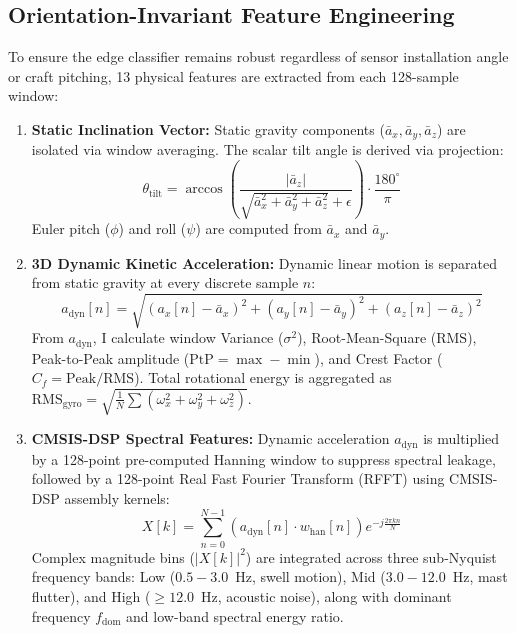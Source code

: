 \documentclass[twocolumn]{article}
\begin{document}
\subsection{Orientation-Invariant Feature Engineering}
To ensure the edge classifier remains robust regardless of sensor installation angle or craft pitching, 13 physical features are extracted from each 128-sample window:
\begin{enumerate}[noitemsep]
    \item \textbf{Static Inclination Vector:} Static gravity components ($\bar{a}_x, \bar{a}_y, \bar{a}_z$) are isolated via window averaging. The scalar tilt angle is derived via projection:
    \begin{equation}
        \theta_{\text{tilt}} = \arccos \left( \frac{|\bar{a}_z|}{\sqrt{\bar{a}_x^2 + \bar{a}_y^2 + \bar{a}_z^2} + \epsilon} \right) \cdot \frac{180^\circ}{\pi}
    \end{equation}
    Euler pitch ($\phi$) and roll ($\psi$) are computed from $\bar{a}_x$ and $\bar{a}_y$.
    \item \textbf{3D Dynamic Kinetic Acceleration:} Dynamic linear motion is separated from static gravity at every discrete sample $n$:
    \begin{equation}
        a_{\text{dyn}}[n] = \sqrt{(a_x[n]-\bar{a}_x)^2 + (a_y[n]-\bar{a}_y)^2 + (a_z[n]-\bar{a}_z)^2}
    \end{equation}
    From $a_{\text{dyn}}$, I calculate window Variance ($\sigma^2$), Root-Mean-Square ($\text{RMS}$), Peak-to-Peak amplitude ($\text{PtP} = \max - \min$), and Crest Factor ($C_f = \text{Peak}/\text{RMS}$). Total rotational energy is aggregated as $\text{RMS}_{\text{gyro}} = \sqrt{\frac{1}{N}\sum (\omega_x^2 + \omega_y^2 + \omega_z^2)}$.
    \item \textbf{CMSIS-DSP Spectral Features:} Dynamic acceleration $a_{\text{dyn}}$ is multiplied by a 128-point pre-computed Hanning window to suppress spectral leakage, followed by a 128-point Real Fast Fourier Transform (RFFT) using CMSIS-DSP assembly kernels:
    \begin{equation}
        X[k] = \sum_{n=0}^{N-1} \left( a_{\text{dyn}}[n] \cdot w_{\text{han}}[n] \right) e^{-j \frac{2\pi k n}{N}}
    \end{equation}
    Complex magnitude bins ($|X[k]|^2$) are integrated across three sub-Nyquist frequency bands: Low ($0.5-3.0$~Hz, swell motion), Mid ($3.0-12.0$~Hz, mast flutter), and High ($\ge 12.0$~Hz, acoustic noise), along with dominant frequency $f_{\text{dom}}$ and low-band spectral energy ratio.
\end{enumerate}
\end{document}
